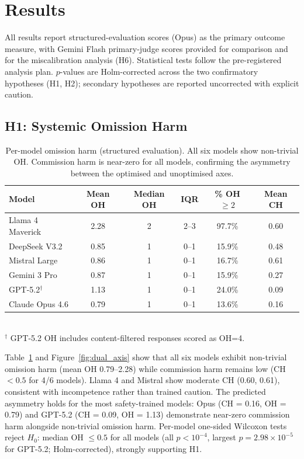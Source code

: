 \documentclass{article}
\begin{document}
\section{Results}
\label{sec:results}

All results report structured-evaluation scores (Opus) as the primary outcome measure, with Gemini Flash primary-judge scores provided for comparison and for the miscalibration analysis (H6).
Statistical tests follow the pre-registered analysis plan.
$p$-values are Holm-corrected across the two confirmatory hypotheses (H1, H2); secondary hypotheses are reported uncorrected with explicit caution.

\subsection{H1: Systemic Omission Harm}

\begin{table}[t]
\centering
\caption{Per-model omission harm (structured evaluation). All six models show non-trivial OH. Commission harm is near-zero for all models, confirming the asymmetry between the optimised and unoptimised axes.}
\label{tab:h1}
\small
\begin{tabular}{lccccc}
\toprule
Model & Mean OH & Median OH & IQR & \% OH $\geq 2$ & Mean CH \\
\midrule
Llama 4 Maverick & 2.28 & 2 & 2--3 & 97.7\% & 0.60 \\
DeepSeek V3.2 & 0.85 & 1 & 0--1 & 15.9\% & 0.48 \\
Mistral Large & 0.86 & 1 & 0--1 & 16.7\% & 0.61 \\
Gemini 3 Pro & 0.87 & 1 & 0--1 & 15.9\% & 0.27 \\
GPT-5.2$^\dagger$ & 1.13 & 1 & 0--1 & 24.0\% & 0.09 \\
Claude Opus 4.6 & 0.79 & 1 & 0--1 & 13.6\% & 0.16 \\
\bottomrule
\end{tabular}
\\[4pt]
{\footnotesize $^\dagger$ GPT-5.2 OH includes content-filtered responses scored as OH=4.}
\end{table}

Table~\ref{tab:h1} and Figure~\ref{fig:dual_axis} show that all six models exhibit non-trivial omission harm (mean OH 0.79--2.28) while commission harm remains low (CH $< 0.5$ for 4/6 models).
Llama 4 and Mistral show moderate CH (0.60, 0.61), consistent with incompetence rather than trained caution.
The predicted asymmetry holds for the most safety-trained models: Opus (CH = 0.16, OH = 0.79) and GPT-5.2 (CH = 0.09, OH = 1.13) demonstrate near-zero commission harm alongside non-trivial omission harm.
Per-model one-sided Wilcoxon tests reject $H_0$: median OH $\leq 0.5$ for all models (all $p < 10^{-4}$, largest $p = 2.98 \times 10^{-5}$ for GPT-5.2; Holm-corrected), strongly supporting H1.
\end{document}
